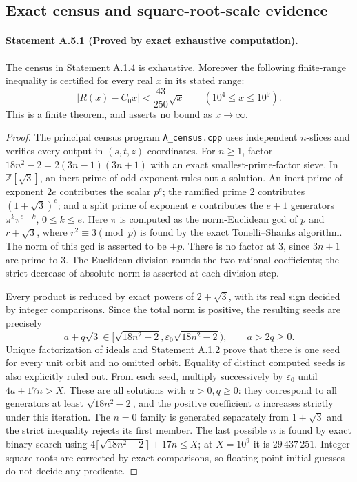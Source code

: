 \subsection{Exact census and square-root-scale evidence}
\paragraph{Statement A.5.1 (Proved by exact exhaustive computation).}
The census in Statement A.1.4 is exhaustive. Moreover the following
finite-range inequality is certified for every real $x$ in its stated
range:
\begin{equation}\label{A:finite-bound}
 |R(x)-C_0x|<\frac{43}{250}\sqrt{x}
 \qquad(10^4\leq x\leq10^9).
\end{equation}
This is a finite theorem, and asserts no bound as $x\to\infty$.
\begin{proof}
The principal census program \texttt{A\_census.cpp} uses independent
$n$-slices and verifies every output in $(s,t,z)$ coordinates. For
$n\geq1$, factor $18n^2-2=2(3n-1)(3n+1)$ with an exact smallest-prime-factor
sieve. In $\mathbb Z[\sqrt3]$, an inert prime of odd exponent rules out a
solution. An inert prime of exponent $2e$ contributes the scalar $p^e$;
the ramified prime $2$ contributes $(1+\sqrt3)^e$; and a split prime of
exponent $e$ contributes the $e+1$ generators
$\pi^k\bar\pi^{e-k}$, $0\leq k\leq e$.
Here $\pi$ is computed as the norm-Euclidean gcd of $p$ and
$r+\sqrt3$, where $r^2\equiv3\pmod p$ is found by the exact
Tonelli--Shanks algorithm. The norm of this gcd is asserted to be $\pm p$.
There is no factor at $3$, since $3n\pm1$ are prime to $3$.
The Euclidean division rounds the two rational coefficients; the strict
decrease of absolute norm is asserted at each division step.

Every product is reduced by exact powers of $2+\sqrt3$, with its real
sign decided by integer comparisons. Since the total norm is positive,
the resulting seeds are precisely
\[
 a+q\sqrt3\in[\sqrt{18n^2-2},\varepsilon_0\sqrt{18n^2-2}),
 \qquad a>2q\geq0.
\]
Unique factorization of ideals and Statement A.1.2 prove that there is
one seed for every unit orbit and no omitted orbit. Equality of distinct
computed seeds is also explicitly ruled out. From each seed, multiply
successively by $\varepsilon_0$ until $4a+17n>X$. These are all solutions
with $a>0,q\geq0$: they correspond to all generators at least
$\sqrt{18n^2-2}$, and the positive coefficient $a$ increases strictly
under this iteration. The $n=0$ family is generated separately from
$1+\sqrt3$ and the strict inequality rejects its first member.
The last possible $n$ is found by exact binary search using
$4\lceil\sqrt{18n^2-2}\rceil+17n\leq X$; at $X=10^9$ it is
$29\,437\,251$. Integer square roots are corrected by exact comparisons,
so floating-point initial guesses do not decide any predicate.


\end{proof}

